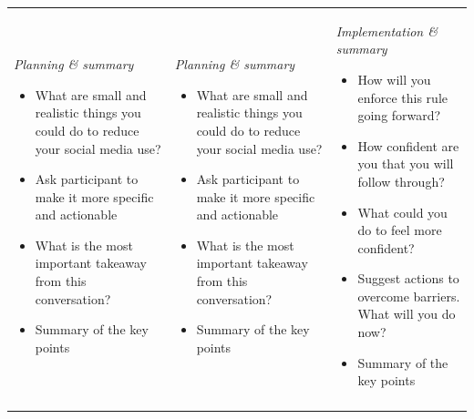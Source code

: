 \begin{tabularx}{\textwidth}{
  >{\raggedright\arraybackslash}X
  >{\raggedright\arraybackslash}X
  >{\raggedright\arraybackslash}X}
\begin{minipage}[t]{\linewidth}\vspace{0pt}
\textit{Planning \& summary}
\begin{itemize}[leftmargin=*,nosep]
\item What are small and realistic things you could do to reduce your social media use?
\item Ask participant to make it more specific and actionable
\item What is the most important takeaway from this conversation?
\item Summary of the key points
\end{itemize}
\end{minipage}
\vspace{-0.5em}
&
\begin{minipage}[t]{\linewidth}\vspace{0pt}
\textit{Planning \& summary}
\begin{itemize}[leftmargin=*,nosep]
\item What are small and realistic things you could do to reduce your social media use?
\item Ask participant to make it more specific and actionable
\item What is the most important takeaway from this conversation?
\item Summary of the key points
\end{itemize}
\end{minipage}
\vspace{-0.5em}
&
\begin{minipage}[t]{\linewidth}\vspace{0pt}
\textit{Implementation \& summary}
\begin{itemize}[leftmargin=*,nosep]
\item How will you enforce this rule going forward?
\item How confident are you that you will follow through?
\item What could you do to feel more confident?
\item Suggest actions to overcome barriers. What will you do now?
\item Summary of the key points
\end{itemize}
\end{minipage}\vspace{-0.5em}
\\
\vspace{-0.5em}
\begin{minipage}[t]{\linewidth}\vspace{0pt}

\end{minipage}
\end{tabularx}
